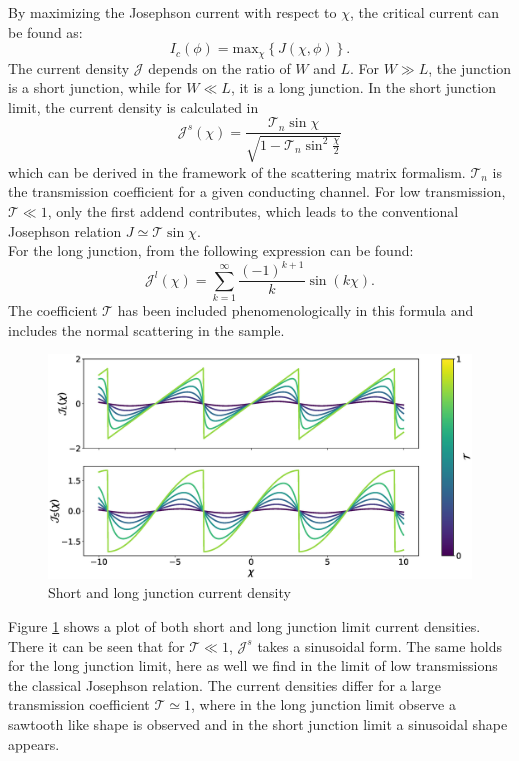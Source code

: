 By maximizing the Josephson current with respect to $\chi$, the critical current can be found as:
\begin{equation}
I_c(\phi) = \text{max}_{\chi}\left\{ J(\chi, \phi) \right\}\label{eq:josephson-relation}.
\end{equation} 
The current density $\mathcal{J}$ depends on the ratio of $W$ and $L$. For $W \gg L$, the junction is a short junction, while for $W \ll L$, it is a long junction. 
In the short junction limit, the current density is calculated in \cite{Beenakker1991}
\begin{equation}
\mathcal{J}^s (\chi) = \frac{\mathcal{T}_n \sin \chi}{\sqrt{1 - \mathcal{T}_n \sin^2 \frac{\chi}{2}}}
\end{equation}
which can be derived in the framework of the scattering matrix formalism. $\mathcal{T}_n$ is the transmission coefficient for a given conducting channel. For low transmission, $\mathcal{T} \ll 1$, only the first addend contributes, which leads to the conventional Josephson relation $J \simeq \mathcal{T} \sin \chi$.\\
For the long junction, from \cite{Barzykin1999} the following expression can be found:
\begin{equation}
\mathcal{J}^l(\chi) = \sum_{k = 1}^{\infty} \frac{(-1)^{k+1}}{k} \sin( k \chi).
\end{equation}
The coefficient $\mathcal{T}$ has been included phenomenologically in this formula and includes the normal scattering in the sample.
\begin{figure}
\centering
\includegraphics[width=\textwidth]{figure/analyticalmodel/current_density_all}
\caption{Short and long junction current density}
\label{fig:current_density}
\end{figure}
Figure \ref{fig:current_density} shows a plot of both short and long junction limit current densities. There it can be seen that for $\mathcal{T} \ll 1$, $\mathcal{J}^s$ takes a sinusoidal form. The same holds for the long junction limit, here as well we find in the limit of low transmissions the classical Josephson relation. The current densities differ for a large transmission coefficient $\mathcal{T} \simeq 1$, where in the long junction limit observe a sawtooth like shape is observed and in the short junction limit a sinusoidal shape appears.\\

